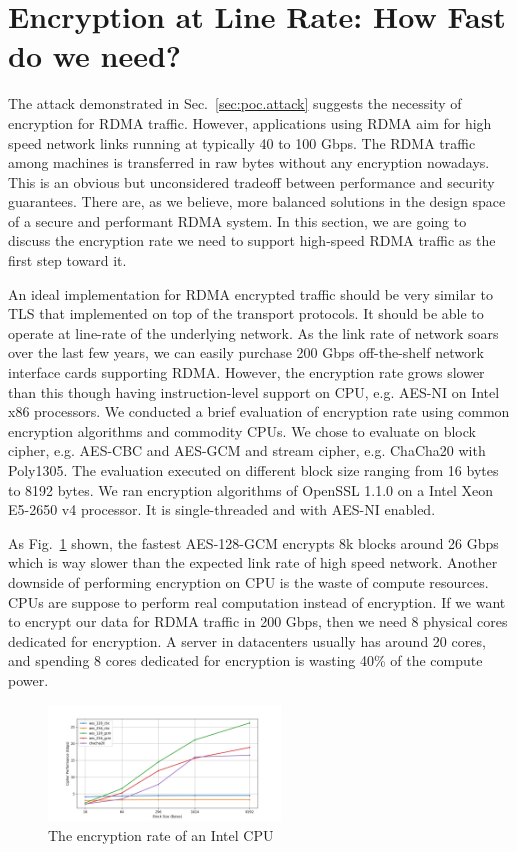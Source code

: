 \section{Encryption at Line Rate: How Fast do we need?}
\label{sec:crypto}

The attack demonstrated in Sec.~\ref{sec:poc.attack} suggests the necessity of encryption for RDMA traffic.
However, applications using RDMA aim for high speed network links running at typically 40 to 100 Gbps.
The RDMA traffic among machines is transferred in raw bytes without any encryption nowadays.
This is an obvious but unconsidered tradeoff between performance and security guarantees.
There are, as we believe, more balanced solutions in the design space of a secure and performant RDMA system.
In this section, we are going to discuss the encryption rate we need to support high-speed RDMA traffic
as the first step toward it.

An ideal implementation for RDMA encrypted traffic should be very similar to TLS that implemented on top of the transport protocols. It should be able to operate at line-rate of the underlying network. As the link rate of network soars over the last few years, we can easily purchase 200 Gbps off-the-shelf network interface cards supporting RDMA. However, the encryption rate grows slower than this though having instruction-level support on CPU, e.g. AES-NI on Intel x86 processors. We conducted a brief evaluation of encryption rate using common encryption algorithms and commodity CPUs. We chose to evaluate on block cipher, e.g. AES-CBC and AES-GCM and stream cipher, e.g. ChaCha20 with Poly1305. The evaluation executed on different block size ranging from 16 bytes to 8192 bytes. We ran encryption algorithms of OpenSSL 1.1.0 on a Intel Xeon E5-2650 v4 processor. It is single-threaded and with AES-NI enabled.

As Fig.~\ref{fig:cpu_encryption_rate} shown, the fastest AES-128-GCM encrypts 8k blocks around 26 Gbps which is way slower than the expected link rate of high speed network. Another downside of performing encryption on CPU is the waste of compute resources. CPUs are suppose to perform real computation instead of encryption. If we want to encrypt our data for RDMA traffic in 200 Gbps, then we need 8 physical cores dedicated for encryption. A server in datacenters usually has around 20 cores, and spending 8 cores dedicated for encryption is wasting 40\% of the compute power.

\begin{figure}[ht]
    \centering
    \includegraphics[width=0.55\textwidth]{fig/encryption}
    \caption{The encryption rate of an Intel CPU}
    \label{fig:cpu_encryption_rate}
\end{figure}

